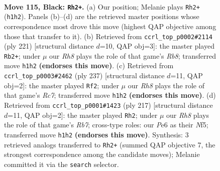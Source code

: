 \documentclass[11pt]{article}
\begin{document}
\clearpage

\begin{figure}[p]\centering
\begin{subfigure}{0.46\textwidth}\centering
\resizebox{\linewidth}{!}{%
\newchessgame
\chessboard[
  setfen={3k4/1R6/4p3/4P3/5PR1/8/5K2/7r b - - 16 115},
  showmover=false,
  pgfstyle=straightmove, color=movearrow, markmove={h1-h2}
]}
\caption{}
\end{subfigure}\hfill
\begin{subfigure}{0.46\textwidth}\centering
\resizebox{\linewidth}{!}{%
\newchessgame
\chessboard[
  setfen={7R/8/6k1/6p1/4P3/5P2/6K1/1r6 b - - 60 111},
  showmover=false,
  pgfstyle=straightmove, color=movearrow, markmove={b1-b2}
]}
\caption{}
\end{subfigure}
\\[4pt]
\begin{subfigure}{0.46\textwidth}\centering
\resizebox{\linewidth}{!}{%
\newchessgame
\chessboard[
  setfen={8/8/6kp/8/5P2/6PK/2r5/3R4 b - - 54 119},
  showmover=false,
  pgfstyle=straightmove, color=movearrow, markmove={c2-f2}
]}
\caption{}
\end{subfigure}\hfill
\begin{subfigure}{0.46\textwidth}\centering
\resizebox{\linewidth}{!}{%
\newchessgame
\chessboard[
  setfen={8/7P/R5P1/5n2/5k2/8/1r6/4K3 b - - 0 109},
  showmover=false,
  pgfstyle=straightmove, color=movearrow, markmove={b2-h2}
]}
\caption{}
\end{subfigure}
\caption{\textbf{Move 115, Black: \texttt{Rh2+}.} (a) Our position; Melanie plays \texttt{Rh2+} (\texttt{h1h2}). Panels (b)--(d) are the retrieved master positions whose correspondence most drove this move (highest QAP objective among those that transfer to it). (b) Retrieved from \texttt{ccrl\_top\_p0002\#2114} (ply 221) [structural distance $d$=10, QAP obj=3]: the master played \texttt{Rb2+}; under $\mu$ our \emph{Rh8} plays the role of that game's \emph{Rb8}; transferred move \texttt{h1h2} \textbf{(endorses this move)}. (c) Retrieved from \texttt{ccrl\_top\_p0003\#2462} (ply 237) [structural distance $d$=11, QAP obj=2]: the master played \texttt{Rf2}; under $\mu$ our \emph{Rh8} plays the role of that game's \emph{Rc7}; transferred move \texttt{h1h2} \textbf{(endorses this move)}. (d) Retrieved from \texttt{ccrl\_top\_p0001\#1423} (ply 217) [structural distance $d$=11, QAP obj=2]: the master played \texttt{Rh2}; under $\mu$ our \emph{Rh8} plays the role of that game's \emph{Rb7}; cross-type roles: our \emph{P}e6 as their \emph{N}f5; transferred move \texttt{h1h2} \textbf{(endorses this move)}. Synthesis: 3 retrieved analogs transferred to \texttt{Rh2+} (summed QAP objective 7, the strongest correspondence among the candidate moves); Melanie committed it via the \texttt{search} selector.}
\label{fig:thought-m229}
\end{figure}
\end{document}
